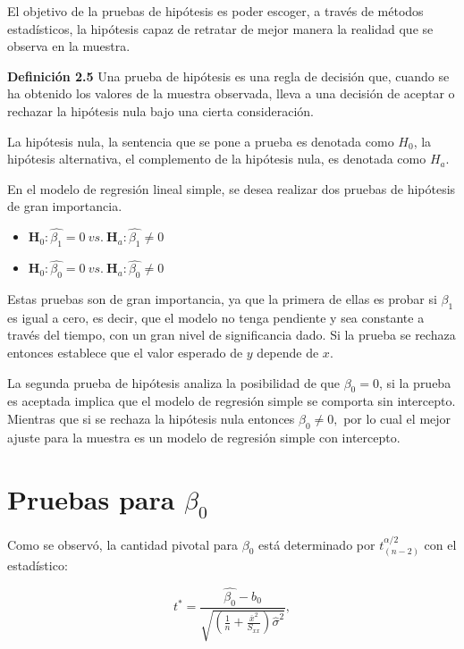\documentclass[
  a4paper,
  oneside,
  openany]{book}
\begin{document}
El objetivo de la pruebas de hipótesis es poder escoger, a través de métodos estadísticos, la hipótesis capaz de retratar de mejor manera la realidad que se observa en la muestra.

\textbf{Definición 2.5} Una prueba de hipótesis es una regla de decisión que, cuando se ha obtenido los valores de la muestra observada, lleva a una decisión de aceptar o rechazar la hipótesis nula bajo una cierta consideración.

La hipótesis nula, la sentencia que se pone a prueba es denotada como \(H_0\), la hipótesis alternativa, el complemento de la hipótesis nula, es denotada como \(H_a.\)

En el modelo de regresión lineal simple, se desea realizar dos pruebas de hipótesis de gran importancia.

\begin{itemize}
\item
  \(\textbf{H}_0: \hat{\beta_{1}}=0 \ vs. \  \textbf{H}_a:\hat{\beta_{1}} \neq 0\)
\item
  \(\textbf{H}_0: \hat{\beta_{0}}=0 \ vs. \  \textbf{H}_a:\hat{\beta_{0}} \neq 0\)
\end{itemize}

Estas pruebas son de gran importancia, ya que la primera de ellas es probar si \(\beta_{1}\) es igual a cero, es decir, que el modelo no tenga pendiente y sea constante a través del tiempo, con un gran nivel de significancia dado. Si la prueba se rechaza entonces establece que el valor esperado de \(y\) depende de \(x\).

La segunda prueba de hipótesis analiza la posibilidad de que \(\beta_{0}=0\), si la prueba es aceptada implica que el modelo de regresión simple se comporta sin intercepto. Mientras que si se rechaza la hipótesis nula entonces \(\beta_{0}\neq 0,\) por lo cual el mejor ajuste para la muestra es un modelo de regresión simple con intercepto.

\hypertarget{pruebas-para-beta_0}{%
\section{\texorpdfstring{Pruebas para \(\beta_{0}\)}{Pruebas para \textbackslash beta\_\{0\}}}\label{pruebas-para-beta_0}}

Como se observó, la cantidad pivotal para \(\beta_{0}\) está determinado por \(t^{\alpha/2}_{(n-2)}\) con el estadístico:

\[t^*=\frac{\hat{\beta_{0}}-b_{0}}{\sqrt{\left(\frac{1}{n}+\frac{\overline{x}^2}{S_{xx}}\right)\hat{\sigma}^2}},\]
\end{document}
